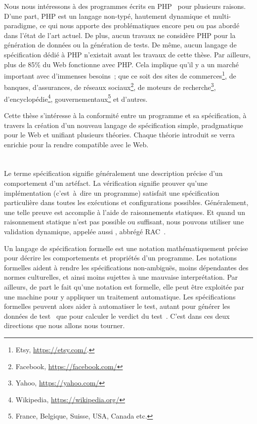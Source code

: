 Nous nous intéressons à des programmes écrits en PHP~ pour plusieurs
raisons. D'une part, PHP est un langage non-typé, hautement dynamique et
multi-paradigme, ce qui nous apporte des problématiques encore peu ou pas abordé
dans l'état de l'art actuel.  De plus, aucun travaux ne considère PHP pour la
génération de données ou la génération de tests. De même, aucun langage de
spécification dédié à PHP n'existait avant les travaux de cette thèse. Par
ailleurs, plus de 85\% du Web fonctionne avec PHP. Cela implique qu'il y a un
marché important avec d'immenses besoins~; que ce soit des sites de
commerces\footnote{Etsy, \url{https://etsy.com/}.}, de banques, d'assurances, de
réseaux sociaux\footnote{Facebook, \url{https://facebook.com/}}, de moteurs de
recherche\footnote{Yahoo, \url{https://yahoo.com/}},
d'encyclopédie\footnote{Wikipedia, \url{https://wikipedia.org/}},
gouvernementaux\footnote{France, Belgique, Suisse, USA, Canada etc.} et
d'autres.

Cette thèse s'intéresse à la conformité entre un programme et sa spécification,
à travers la création d'un nouveau langage de spécification simple, pradgmatique
pour le Web et unifiant plusieurs théories. Chaque théorie introduit se verra
enrichie pour la rendre compatible avec le Web.

\section{}
\label{section:sota:bisl}

Le terme {\strong spécification} signifie généralement une description précise
d'un comportement d'un artéfact. La {\strong vérification} signifie prouver
qu'une implémentation (c'est~à~dire un programme) satisfait une spécification
particulière dans toutes les exécutions et configurations possibles.
Généralement, une telle preuve est accomplie à l'aide de raisonnements
statiques. Et quand un raisonnement statique n'est pas possible ou suffisant,
nous pouvons utiliser une {\strong validation} dynamique, appelée aussi
, abbrégé RAC~.

Un {\strong langage de spécification} formelle est une notation mathématiquement
précise pour décrire les comportements et propriétés d'un programme. Les
{\strong notations formelles} aident à rendre les spécifications non-ambiguës,
moins dépendantes des normes culturelles, et ainsi moins sujettes à une mauvaise
interprétation. Par ailleurs, de part le fait qu'une notation est formelle, elle
peut être exploitée par une machine pour y appliquer un traitement automatique.
Les spécifications formelles peuvent alors aider à {\strong automatiser le
test}, autant pour générer les données de test~ que pour calculer le verdict du test~.
C'est dans ces deux directions que nous allons nous tourner.

